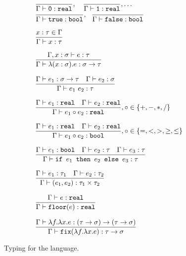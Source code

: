 \begin{figure}
\[
\begin{array}{lr}
\dfrac{}{\Gamma \vdash \texttt{0}: \texttt{real}}, \quad \dfrac{}{\Gamma \vdash \texttt{1}: \texttt{real}}, \ldots \\
\dfrac{}{\Gamma \vdash \texttt{true} : \texttt{bool}}, \ \ \dfrac{}{\Gamma \vdash \texttt{false} : \texttt{bool}} \\ \\
\dfrac{x : \tau \in \Gamma}{\Gamma \vdash x : \tau } \\ \\
\dfrac{\Gamma, x : \sigma \vdash e : \tau}{\Gamma \vdash \lambda (x : \sigma).e : \sigma \rightarrow \tau } \\ \\ 
\dfrac{\Gamma \vdash e_1: \sigma \rightarrow \tau \ \ \ \Gamma \vdash e_2 : \sigma}{\Gamma \vdash e_1 \ e_2 : \tau} \\ \\ 
\dfrac{\Gamma \vdash e_1 : \texttt{real} \ \ \ \Gamma \vdash e_2 : \texttt{real}}{\Gamma \vdash e_1 \circ e_2 : \texttt{real}}
, \circ \in \{+,-,*,/\} \\ \\ 
\dfrac{\Gamma \vdash e_1 : \texttt{real} \ \ \ \Gamma \vdash e_2 : \texttt{real}}{\Gamma \vdash e_1 \circ e_2 : \texttt{bool}}
, \circ \in \{=, <, >, \geq, \leq\} \\ \\ 
\dfrac{\Gamma \vdash e_1 : \texttt{bool} \ \ \ \Gamma \vdash e_2 : \tau \ \ \ \Gamma \vdash e_3 : \tau}
{\Gamma \vdash \ifelse{e_1}{e_2}{e_3} : \tau} \\ \\ 
\dfrac{\Gamma \vdash e_1 : \tau_1 \ \ \ \Gamma \vdash e_2: \tau_2}{\Gamma \vdash (e_1, e_2) : \tau_1 \times \tau_2} \\ \\
\dfrac{\Gamma \vdash e : \texttt{real}}{\Gamma \vdash \texttt{floor}(e) : \texttt{real}} \\ \\
\dfrac{\Gamma \vdash \lambda f. \lambda x.e : (\tau \rightarrow \sigma) \rightarrow (\tau \rightarrow \sigma)}
{\Gamma \vdash \texttt{fix}(\lambda f. \lambda x.e) : \tau \rightarrow \sigma} 
\end{array}
\]
\caption{Typing for the language.}
\label{fig:typing}
\end{figure}

